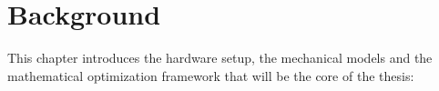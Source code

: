 \documentclass[/home/francois/latex/report/main.tex]{subfiles}
\begin{document}
\chapter{Background}
\label{chapter:background}

This chapter introduces the hardware setup, the mechanical models and the mathematical optimization framework that will be the core of the thesis:
%
%
%
%
%
%
%
\end{document}

